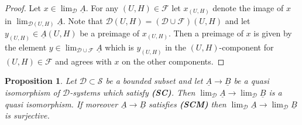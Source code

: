 \documentclass[12pt,a4paper]{article}
\newtheorem{prop}[thm]{Proposition}
\theoremstyle{definition}
\begin{document}
\begin{proof}
Let $x\in \lim_{\mathcal{D}}\underline{A}$. For any $(U,H)\in \mathcal{F}$ let $x_{(U,H)}$ denote the image of $x$ in $\lim_{\mathcal{D}(U,H)}\underline{A}$. Note that $\mathcal{D}(U,H)=(\mathcal{D}\cup\mathcal{F})(U,H)$ and let $y_{(U,H)}\in \underline{A}(U,H)$ be a preimage of $x_{(U,H)}$. Then a preimage of $x$ is given by the element $y\in \lim_{\mathcal{D}\cup\mathcal{F}}\underline{A}$ which is $y_{(U,H)}$ in the $(U,H)$-component for $(U,H)\in \mathcal{F}$ and agrees with $x$ on the other components.
\end{proof}

\begin{prop}\label{prop:SC}
Let $\mathcal{D}\subset \mathcal{S}$ be a bounded subset and let $\underline{A}\rightarrow \underline{B}$ be a quasi isomorphism of $\mathcal{D}$-systems which satisfy \textbf{(SC)}. Then $\lim_{\mathcal{D}}\underline{A}\rightarrow \lim_{\mathcal{D}}\underline{B}$ is a quasi isomorphism. If moreover $\underline{A}\rightarrow\underline{B}$ satisfies \textbf{(SCM)} then $\lim_{\mathcal{D}}\underline{A}\rightarrow \lim_{\mathcal{D}}\underline{B}$ is surjective.
\end{prop}
\end{document}
